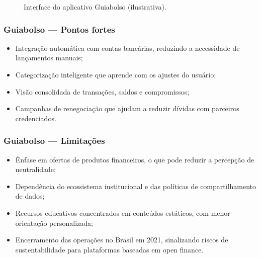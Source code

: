 \begin{figure}[H]
\centering
{}
\caption{Interface do aplicativo Guiabolso (ilustrativa).}
\label{fig:guiabolso}
\end{figure}

\subsubsection*{Guiabolso — Pontos fortes}
\begin{itemize}
    \item Integração automática com contas bancárias, reduzindo a necessidade de lançamentos manuais;
    \item Categorização inteligente que aprende com os ajustes do usuário;
    \item Visão consolidada de transações, saldos e compromissos;
    \item Campanhas de renegociação que ajudam a reduzir dívidas com parceiros credenciados.
\end{itemize}

\subsubsection*{Guiabolso — Limitações}
\begin{itemize}
    \item Ênfase em ofertas de produtos financeiros, o que pode reduzir a percepção de neutralidade;
    \item Dependência do ecossistema institucional e das políticas de compartilhamento de dados;
    \item Recursos educativos concentrados em conteúdos estáticos, com menor orientação personalizada;
    \item Encerramento das operações no Brasil em 2021, sinalizando riscos de sustentabilidade para plataformas baseadas em open finance.
\end{itemize}

